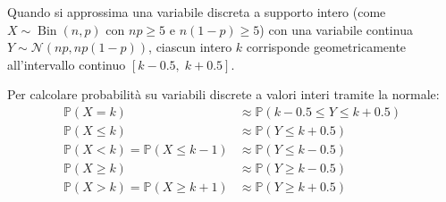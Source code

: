 Quando si approssima una variabile discreta a supporto intero (come $X \sim \operatorname{Bin}(n, p)$ con $np \ge 5$ e $n(1-p) \ge 5$) con una variabile continua $Y \sim \mathcal{N}(np, np(1-p))$, ciascun intero $k$ corrisponde geometricamente all'intervallo continuo $[k - 0.5, \; k + 0.5]$.

\begin{metodo}
Per calcolare probabilità su variabili discrete a valori interi tramite la normale:
\begin{align}
    \mathbb{P}(X = k) &\approx \mathbb{P}(k - 0.5 \le Y \le k + 0.5) \\
    \mathbb{P}(X \le k) &\approx \mathbb{P}(Y \le k + 0.5) \\
    \mathbb{P}(X < k) = \mathbb{P}(X \le k - 1) &\approx \mathbb{P}(Y \le k - 0.5) \\
    \mathbb{P}(X \ge k) &\approx \mathbb{P}(Y \ge k - 0.5) \\
    \mathbb{P}(X > k) = \mathbb{P}(X \ge k + 1) &\approx \mathbb{P}(Y \ge k + 0.5)
\end{align}
\end{metodo}
